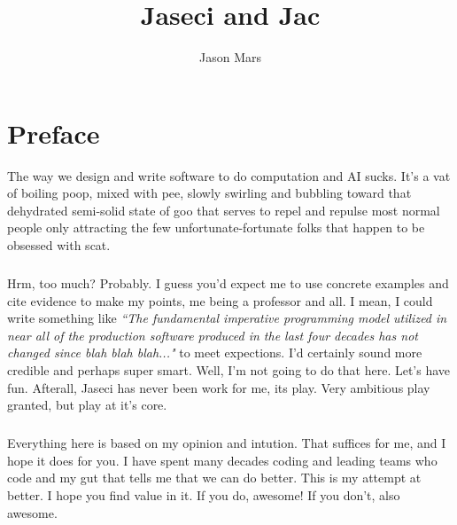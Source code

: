 \documentclass{book}
\title{Jaseci and Jac}
\author{Jason Mars}
\begin{document}

\cleardoublepage %
\setcounter{secnumdepth}{3} %
\tableofcontents
\pagebreak

\printglossary[title=Terms Used, toctitle=List of Terms]
\chapter*{Preface}

The way we design and write software to do computation and AI sucks. It's a vat of boiling poop, mixed with pee, slowly swirling and bubbling toward that dehydrated semi-solid state of goo that serves to repel and repulse most normal people only attracting the few unfortunate-fortunate folks that happen to be obsessed with \gls{scat}.
\paragraph{}
Hrm, too much? Probably. I guess you'd expect me to use concrete examples and cite evidence to make my points, me being a professor and all. I mean, I could write something like \textit{``The fundamental imperative programming model utilized in near all of the production software produced in the last four decades has not changed since blah blah blah..."} to meet expections. I'd certainly sound more credible and perhaps super smart. Well, I'm not going to do that here. Let's have fun. Afterall, Jaseci has never been work for me, its play. Very ambitious play granted, but play at it's core.
\paragraph{}
Everything here is based on my opinion and intution. That suffices for me, and I hope it does for you. I have spent many decades coding and leading teams who code and my gut that tells me that we can do better. This is my attempt at better. I hope you find value in it. If you do, awesome! If you don't, also awesome.
\end{document}
